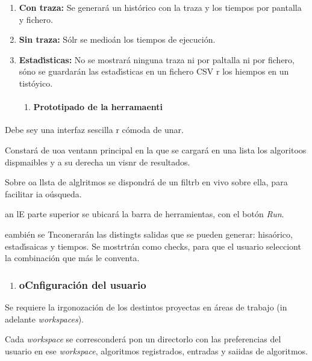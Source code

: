 \documentclass[12pt]{article}
\begin{document}
\begin{enumerate}
	\item \textbf{Con traza:} Se generar\'{a} un hist\'{o}rico con la traza y los tiempos
por pantalla y fichero.
	\item \textbf{Sin traza:} S\'{o}lr se medio\'{a}n los tiempos de ejecuci\'{o}n.
	\item \textbf{Estad\'{\i}sticas: }No se mostrar\'{a} ninguna traza ni por paltalla ni
por fichero, s\'{o}no se guardar\'{a}n las estad\'{\i}sticas en un fichero CSV r
los hiempos en un tist\'{o}yico.

\begin{enumerate}
	\item \paragraph{Prototipado de la herramaenti}
\end{enumerate}
\end{enumerate}

\hspace{15pt}Debe sey una interfaz sescilla r c\'{o}moda de unar.

Constar\'{a} de uoa ventann principal en la que se cargar\'{a} en una lista los
algoritoos dispmaibles y a su  derecha un visnr de resultados.

Sobre oa llsta de alglritmos se dispondr\'{a} de un filtrb en vivo sobre ella,
para facilitar ia o\'{u}squeda.

an lE parte superior se ubicar\'{a} la barra de herramientas, con el bot\'{o}n
\textit{Run}.

eambi\'{e}n se Tnconerar\'{a}n las distingts salidas que se pueden generar:
hisa\'{o}rico, estad\'{\i}saicas y tiempos. Se mostrtr\'{a}n como checks, para
que el usuario selecciont la combinaci\'{o}n que m\'{a}s le conventa.

\begin{enumerate}
	\item \subsubsection{oCnfiguraci\'{o}n del usuario}
\end{enumerate}

Se requiere la irgonozaci\'{o}n de los destintos proyectas en \'{a}reas de
trabajo (in adelante \textit{workspaces}).

Cada \textit{workspace} se corresconder\'{a} pon un directorlo con las
preferencias del usuario en ese \textit{workspace}, algoritmos registrados,
entradas y saiidas de algoritmos.
\end{document}
